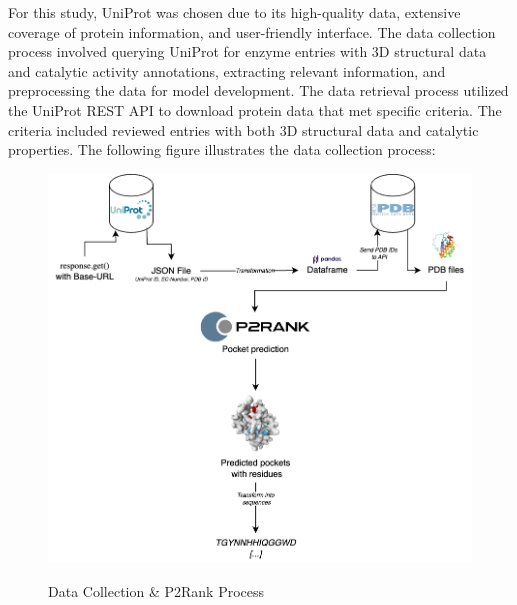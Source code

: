 For this study, UniProt was chosen due to its high-quality data, extensive coverage of protein information, and user-friendly interface. The data collection process involved querying UniProt for enzyme entries with 3D structural data and catalytic activity annotations, extracting relevant information, and preprocessing the data for model development. The data retrieval process utilized the UniProt REST API to download protein data that met specific criteria. The criteria included reviewed entries with both 3D structural data and catalytic properties. The following figure illustrates the data collection process:

\begin{figure}[hbt]
    \centering
    \begin{minipage}[t]{.8\textwidth}
    \caption{Data Collection \& P2Rank Process}
    \includegraphics[width=1\textwidth]{img/Data-Preparation-Processing-Workflow.png}
    \label{fig:Data-Preparation-Processing-Workflow}
    \end{minipage}
\end{figure}


